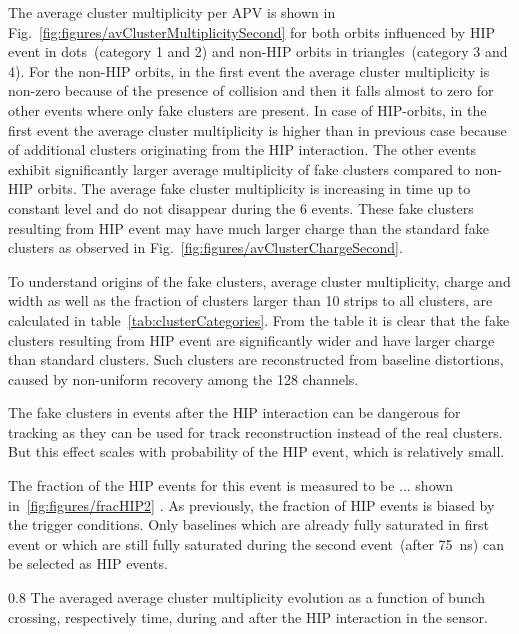 The average cluster multiplicity per APV is shown in Fig.~\ref{fig:figures/avClusterMultiplicitySecond} for both orbits influenced by HIP event in dots~(category 1 and 2) and non-HIP orbits in triangles~(category 3 and 4). For the non-HIP orbits, in the first event the average cluster multiplicity is non-zero because of the presence of collision and then it falls almost to zero for other events where only fake clusters are present. In case of HIP-orbits, in the first event the average cluster multiplicity is higher than in previous case because of additional clusters originating from the HIP interaction. The other events exhibit significantly larger average multiplicity of fake clusters compared to non-HIP orbits. The average fake cluster multiplicity is increasing in time up to constant level and do not disappear during the 6 events. These fake clusters resulting from HIP event may have much larger charge than the standard fake clusters as observed in Fig.~\ref{fig:figures/avClusterChargeSecond}. 

To understand origins of the fake clusters, average cluster multiplicity, charge and width as well as the fraction of clusters larger than 10 strips to all clusters, are calculated in table~\ref{tab:clusterCategories}. From the table it is clear that the fake clusters resulting from HIP event are significantly wider and have larger charge than standard clusters. Such clusters are reconstructed from baseline distortions, caused by non-uniform recovery among the 128 channels.

The fake clusters in events after the HIP interaction can be dangerous for tracking as they can be used for track reconstruction instead of the real clusters. But this effect scales with probability of the HIP event, which is relatively small.

The fraction of the HIP events for this event is measured to be ... shown in~\ref{fig:figures/fracHIP2} . As previously, the fraction of HIP events is biased by the trigger conditions. Only baselines which are already fully saturated in first event or which are still fully saturated during the second event~(after 75~ns) can be selected as HIP events.


                 {0.8}       %
                 {The averaged average cluster multiplicity evolution as a function of bunch crossing, respectively time,  during and after the HIP interaction in the sensor. } %

